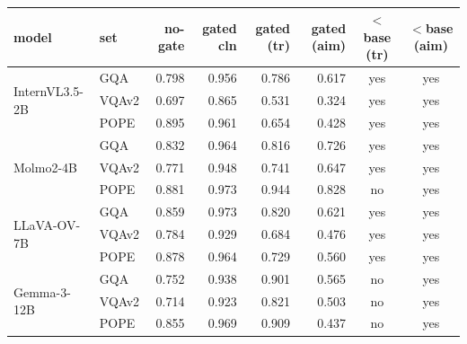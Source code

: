 \vspace{8pt}
\\[2pt]
\footnotesize
\setlength{\tabcolsep}{5pt}
\begin{tabular}{@{}llrrrrcc@{}}
\toprule
model & set & no-gate & gated cln & gated (tr) & gated (aim) & $<$base (tr) & $<$base (aim) \\
\midrule
\multirow{3}{*}{InternVL3.5-2B} & GQA & 0.798 & 0.956 & 0.786 & 0.617 & yes & yes \\
 & VQAv2 & 0.697 & 0.865 & 0.531 & 0.324 & yes & yes \\
 & POPE & 0.895 & 0.961 & 0.654 & 0.428 & yes & yes \\
\midrule
\multirow{3}{*}{Molmo2-4B} & GQA & 0.832 & 0.964 & 0.816 & 0.726 & yes & yes \\
 & VQAv2 & 0.771 & 0.948 & 0.741 & 0.647 & yes & yes \\
 & POPE & 0.881 & 0.973 & 0.944 & 0.828 & no & yes \\
\midrule
\multirow{3}{*}{LLaVA-OV-7B} & GQA & 0.859 & 0.973 & 0.820 & 0.621 & yes & yes \\
 & VQAv2 & 0.784 & 0.929 & 0.684 & 0.476 & yes & yes \\
 & POPE & 0.878 & 0.964 & 0.729 & 0.560 & yes & yes \\
\midrule
\multirow{3}{*}{Gemma-3-12B} & GQA & 0.752 & 0.938 & 0.901 & 0.565 & no & yes \\
 & VQAv2 & 0.714 & 0.923 & 0.821 & 0.503 & no & yes \\
 & POPE & 0.855 & 0.969 & 0.909 & 0.437 & no & yes \\
\bottomrule
\end{tabular}

\vspace{3pt}
